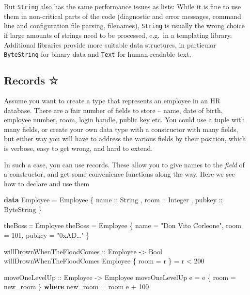 \documentclass[11pt,
  american,
  DIV13]{article}
\newenvironment{Shaded}{}{}
\newcommand{\DataTypeTok}[1]{\textcolor[rgb]{0.56,0.13,0.00}{#1}}
\newcommand{\DecValTok}[1]{\textcolor[rgb]{0.25,0.63,0.44}{#1}}
\newcommand{\KeywordTok}[1]{\textcolor[rgb]{0.00,0.44,0.13}{\textbf{#1}}}
\newcommand{\NormalTok}[1]{#1}
\newcommand{\OperatorTok}[1]{\textcolor[rgb]{0.40,0.40,0.40}{#1}}
\newcommand{\OtherTok}[1]{\textcolor[rgb]{0.00,0.44,0.13}{#1}}
\newcommand{\StringTok}[1]{\textcolor[rgb]{0.25,0.44,0.63}{#1}}
\begin{document}
But \texttt{String} also has the same performance issues as lists: While
it is fine to use them in non-critical parts of the code (diagnostic and
error messages, command line and configuration file parsing, filenames),
\texttt{String} is usually the wrong choice if large amounts of strings
need to be processed, e.g.~in a templating library. Additional libraries
provide more suitable data structures, in particular \texttt{ByteString}
for binary data and \texttt{Text} for human-readable text.

\hypertarget{records}{%
\subsection{Records ☆}\label{records}}

Assume you want to create a type that represents an employee in an HR
database. There are a fair number of fields to store -- name, date of
birth, employee number, room, login handle, public key etc. You could
use a tuple with many fields, or create your own data type with a
constructor with many fields, but either way you will have to address
the various fields by their position, which is verbose, easy to get
wrong, and hard to extend.

In such a case, you can use records. These allow you to give names to
the \emph{field} of a constructor, and get some convenience functions
along the way. Here we see how to declare and use them

\begin{Shaded}
\begin{Highlighting}[]
\KeywordTok{data} \DataTypeTok{Employee} \OtherTok{=} \DataTypeTok{Employee}
\NormalTok{    \{}\OtherTok{ name ::} \DataTypeTok{String}
\NormalTok{    ,}\OtherTok{ room ::} \DataTypeTok{Integer}
\NormalTok{    ,}\OtherTok{ pubkey ::} \DataTypeTok{ByteString}
\NormalTok{    \}}

\OtherTok{theBoss ::} \DataTypeTok{Employee}
\NormalTok{theBoss }\OtherTok{=} \DataTypeTok{Employee}\NormalTok{ \{ name }\OtherTok{=} \StringTok{"Don Vito Corleone"}\NormalTok{, room }\OtherTok{=} \DecValTok{101}\NormalTok{, pubkey }\OtherTok{=} \StringTok{"0xAD…"}\NormalTok{ \}}

\OtherTok{willDrownWhenTheFloodComes ::} \DataTypeTok{Employee} \OtherTok{{-}\textgreater{}} \DataTypeTok{Bool}
\NormalTok{willDrownWhenTheFloodComes }\DataTypeTok{Employee}\NormalTok{ \{ room }\OtherTok{=}\NormalTok{ r \} }\OtherTok{=}\NormalTok{ r }\OperatorTok{\textless{}} \DecValTok{200}

\OtherTok{moveOneLevelUp ::} \DataTypeTok{Employee} \OtherTok{{-}\textgreater{}} \DataTypeTok{Employee}
\NormalTok{moveOneLevelUp e }\OtherTok{=}\NormalTok{ e \{ room }\OtherTok{=}\NormalTok{ new\_room \}}
  \KeywordTok{where}\NormalTok{ new\_room }\OtherTok{=}\NormalTok{ room e }\OperatorTok{+} \DecValTok{100}
\end{Highlighting}
\end{Shaded}
\end{document}
